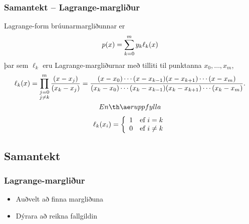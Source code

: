 \documentclass[a4paper,10pt,icelandic]{sphinxmanual}
\begin{document}
\subsubsection{Samantekt – Lagrange-margliður}
\label{kafli03:samantekt-lagrange-margliur}
Lagrange-form brúunarmargliðunnar er
\begin{gather}
\begin{split}p(x)=\sum_{k=0}^m y_k\ell_{k}(x)\end{split}\notag
\end{gather}
þar sem \(\ell_{k}\) eru Lagrange-margliðurnar með tilliti til
punktanna \(x_0,\dots,x_m\),
\begin{gather}
\begin{split}  \ell_{k}(x) = \prod_
      {\substack{j=0\\ j\neq k}}^m\dfrac{(x-x_j)}{(x_k-x_j)}
      = \dfrac{(x-x_0)\cdots(x-x_{k-1})
          (x-x_{k+1})\cdots(x-x_m)}
      {(x_k-x_0)\cdots(x_k-x_{k-1})
          (x_k-x_{k+1})\cdots(x_k-x_m)}.\end{split}\notag\\\begin{split}En þær uppfylla\end{split}\notag
\end{gather}\begin{gather}
\begin{split}\ell_{k}(x_i) = \left\{ \begin{array}{cc}
      1 & \text{ef } i = k \\
      0 & \text{ef } i \not= k
  \end{array} \right.\end{split}\notag
\end{gather}

\subsection{Samantekt}
\label{kafli03:id3}

\subsubsection{Lagrange-margliður}
\label{kafli03:lagrange-margliur}\begin{itemize}
\item {} 
Auðvelt að finna margliðuna

\item {} 
Dýrara að reikna fallgildin

\end{itemize}
\end{document}

